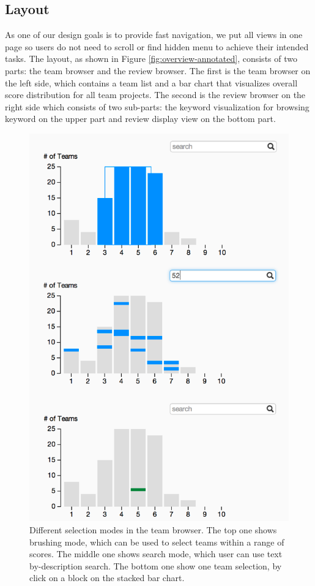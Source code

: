 \documentclass{sigchi}
\begin{document}
\subsection{Layout}
As one of our design goals is to provide fast navigation,
we put all views in one page so users do not need to scroll or find hidden
menu to achieve their intended tasks. The layout, as shown in Figure
\ref{fig:overview-annotated}, consists of two parts:
the team browser and the review
browser.  The first is the team browser on the left side, which contains a
team list and a bar chart that visualizes overall score distribution for all
team projects. The second is the review browser on the right side which
consists of two sub-parts: the keyword visualization for browsing keyword on
the upper part and review display view on the bottom part.

\begin{figure}[]
\centering
\includegraphics[width=\columnwidth]{images/3charts}
\caption{Different selection modes in the team browser.
The top one shows brushing mode, which can be used to select teams within a range of scores.
The middle one shows search mode, which user can use text by-description search.
The bottom one show one team selection, by click on a block on the stacked bar chart.}
\label{fig:keyword-lists}
\end{figure}
\end{document}
